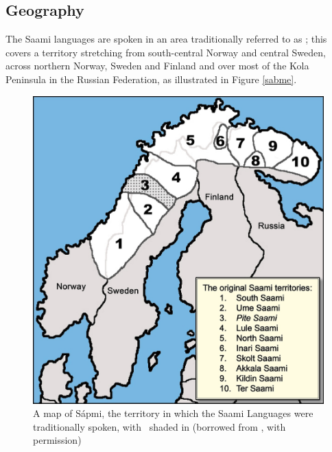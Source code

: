 \subsection{Geography}\label{geography}
The Saami languages are spoken in an area traditionally referred to as ; this covers a territory stretching from south-central Norway and central Sweden, across northern Norway, Sweden and Finland and over most of the Kola Peninsula in the Russian Federation, as illustrated in Figure \vref{sabme}. 
\begin{figure}
\centering
\includegraphics[width=.5\textwidth]{images/SaamiTerritoryMapPiteENsmall.jpg}
\caption[A map of , the territory in which the Saami Languages were traditionally spoken]{A map of Sápmi, the territory in which the Saami Languages were traditionally spoken, with \PS\ shaded in (borrowed from \mbox{\cite[7]{BullEtal2007}}, with permission)}\label{sabme}
\end{figure}

